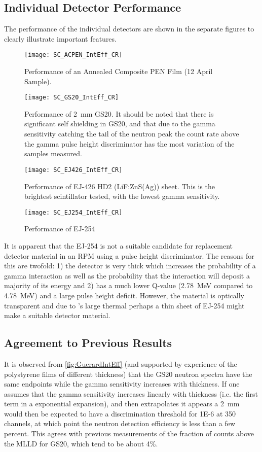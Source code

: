 \documentclass[onecolumn]{IEEEtran}
\begin{document}
\subsection{Individual Detector Performance}
The performance of the individual detectors are shown in the separate figures to clearly illustrate important features.
\begin{figure}
  \centering
  \texttt{[image: SC\_ACPEN\_IntEff\_CR]}
  \caption[Annealed Composite PEN Performance]{Performance of an Annealed Composite PEN Film (12 April Sample).}
  \label{fig:ACPENPreformance}
\end{figure}
\begin{figure}
  \centering
  \texttt{[image: SC\_GS20\_IntEff\_CR]}
  \caption[GS20 Performance]{Performance of \SI{2}{\mm} GS20.  It should be noted that there is significant self shielding in GS20, and that due to the gamma sensitivity catching the tail of the neutron peak the count rate above the gamma pulse height discriminator has the most variation of the samples measured.}
  \label{fig:GS20Preformance}
\end{figure}
\begin{figure}
  \centering
  \texttt{[image: SC\_EJ426\_IntEff\_CR]}
  \caption[EJ 426 Performance]{Performance of EJ-426 HD2 (LiF:ZnS(Ag)) sheet.  This is the brightest scintillator tested, with the lowest gamma sensitivity.}
  \label{fig:EJ254Perf}
\end{figure}
\begin{figure}
  \centering
  \texttt{[image: SC\_EJ254\_IntEff\_CR]}
  \caption[EJ 254 Performance]{Performance of EJ-254}
  \label{fig:EJ254Preformance}
\end{figure}
It is apparent that the EJ-254 is not a suitable candidate for replacement detector material in an RPM using a pulse height discriminator.
The reasons for this are twofold: 1) the detector is very thick which increases the probability of a gamma interaction as well as the probability that the interaction will deposit a majority of its energy and 2)  has a much lower Q-value (\SI{2.78}{\MeV} compared to \SI{4.78}{\MeV}) and a large pulse height deficit.
However, the material is optically transparent and due to 's large thermal perhaps a thin sheet of EJ-254 might make a suitable detector material.
\subsection{Agreement to Previous Results}
It is observed from \autoref{fig:GuerardIntEff} (and supported by experience of the polystyrene films of different thickness) that the GS20 neutron spectra have the same endpoints while the gamma sensitivity increases with thickness.
If one assumes that the gamma sensitivity increases linearly with thickness (i.e. the first term in a exponential expansion), and then extrapolates it appears a \SI{2}{\mm} would then be expected to have a discrimination threshold for \num{1E-6} at 350 channels, at which point the neutron detection efficiency is less than a few percent.
This agrees with previous measurements of the fraction of counts above the MLLD for GS20, which tend to be about 4\%.
\end{document}
